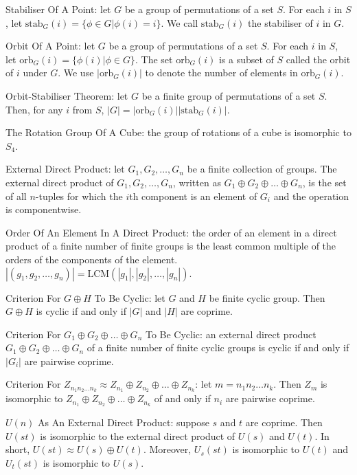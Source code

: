 Stabiliser Of A Point: let $G$ be a group of permutations of a set $S$. For each $i$ in $S$, let $\text{stab}_G (i) = \{\phi \in G | \phi (i)=i \}$. We call $\text{stab}_G (i)$ the stabiliser of $i$ in $G$.

Orbit Of A Point: let $G$ be a group of permutations of a set $S$. For each $i$ in $S$, let $\text{orb}_G (i) = \{\phi (i) | \phi \in G \}$. The set $\text{orb}_G (i)$ is a subset of $S$ called the orbit of $i$ under $G$. We use $|\text{orb}_G (i)|$ to denote the number of elements in $\text{orb}_G (i)$.

Orbit-Stabiliser Theorem: let $G$ be a finite group of permutations of a set $S$. Then, for any $i$ from $S$, $|G|=|\text{orb}_G (i)||\text{stab}_G (i)|$.

The Rotation Group Of A Cube: the group of rotations of a cube is isomorphic to $S_4$.

External Direct Product: let $G_1,G_2,\dots,G_n$ be a finite collection of groups. The external direct product of $G_1,G_2,\dots,G_n$, written as $G_1 \oplus G_2 \oplus \dots \oplus G_n$, is the set of all $n$-tuples for which the $i$th component is an element of $G_i$ and the operation is componentwise.

Order Of An Element In A Direct Product: the order of an element in a direct product of a finite number of finite groups is the least common multiple of the orders of the components of the element. $|(g_1,g_2,\dots,g_n)|=\text{LCM}(|g_1|,|g_2|,\dots,|g_n|)$.

Criterion For $G \oplus H$ To Be Cyclic: let $G$ and $H$ be finite cyclic group. Then $G \oplus H$ is cyclic if and only if $|G|$ and $|H|$ are coprime.

Criterion For $G_1 \oplus G_2 \oplus \dots \oplus G_n$ To Be Cyclic: an external direct product $G_1 \oplus G_2 \oplus \dots \oplus G_n$ of a finite number of finite cyclic groups is cyclic if and only if $|G_i|$ are pairwise coprime.

Criterion For $Z_{n_1 n_2 \dots n_k} \approx Z_{n_1} \oplus Z_{n_2} \oplus \dots \oplus Z_{n_k}$: let $m = n_1 n_2 \dots n_k$. Then $Z_m$ is isomorphic to $Z_{n_1} \oplus Z_{n_2} \oplus \dots \oplus Z_{n_k}$ of and only if $n_i$ are pairwise coprime.

$U(n)$ As An External Direct Product: suppose $s$ and $t$ are coprime. Then $U(st)$ is isomorphic to the external direct product of $U(s)$ and $U(t)$. In short, $U(st) \approx U(s) \oplus U(t)$. Moreover, $U_s (st)$ is isomorphic to $U(t)$ and $U_t (st)$ is isomorphic to $U(s)$.

